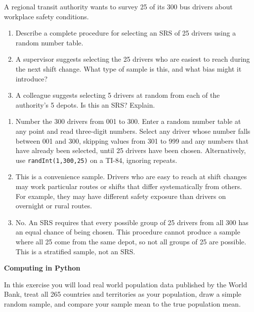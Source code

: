 \begin{Exercise}[title={Selecting an SRS}, label={ex:srs}]
A regional transit authority wants to survey 25 of its 300 bus drivers about workplace safety conditions.

\begin{enumerate} 
    \item Describe a complete procedure for selecting an SRS of 25 drivers using a random number table.
    \item A supervisor suggests selecting the 25 drivers who are easiest to reach during the next shift change. What type of 
    sample is this, and what bias might it introduce?
    \item A colleague suggests selecting 5 drivers at random from each of the authority's 5 depots. Is this an SRS? Explain.
\end{enumerate}
\end{Exercise}
\begin{Answer}[ref={ex:srs}]
\begin{enumerate} 
    \item Number the 300 drivers from 001 to 300. Enter a random number table at any point and read three-digit numbers. 
    Select any driver whose number falls between 001 and 300, skipping values from 301 to 999 and any numbers that have already been 
    selected, until 25 drivers have been chosen. Alternatively, use \texttt{randInt(1,300,25)} on a TI-84, ignoring repeats.
    \item This is a convenience sample. Drivers who are easy to reach at shift changes may work particular routes or shifts that 
    differ systematically from others. For example, they may have different safety exposure than drivers on overnight or rural routes.
    \item No. An SRS requires that every possible group of 25 drivers from all 300 has an equal chance of being chosen. This procedure 
    cannot produce a sample where all 25 come from the same depot, so not all groups of 25 are possible. This is a stratified sample, 
    not an SRS.
\end{enumerate}
\end{Answer}

\textbf{Computing in Python}

In this exercise you will load real world population data published by the World Bank, treat all 265 countries and territories as your population, draw a simple random sample, and compare your sample mean to the true population mean.

